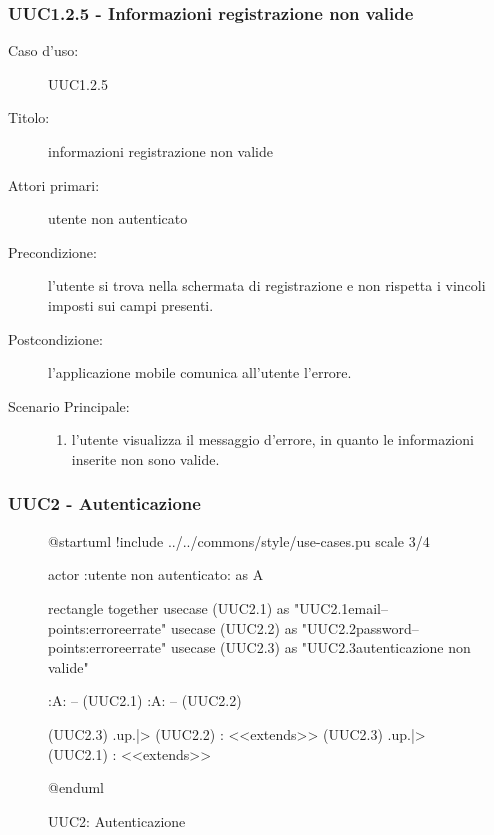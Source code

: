 \documentclass[casi-duso]{subfiles}
\begin{document}
\subsubsection{UUC1.2.5 - Informazioni registrazione non valide}%
\label{subsub:UUC1.2.5utente}
\begin{description}
  \item[Caso d’uso:] UUC1.2.5
  \item[Titolo:] informazioni registrazione non valide
  \item[Attori primari:] utente non autenticato
  \item[Precondizione:] l'utente si trova nella schermata di registrazione e non rispetta i vincoli imposti sui campi presenti.
  \item[Postcondizione:] l'applicazione mobile comunica all'utente l'errore.
  \item[Scenario Principale:]
        \begin{enumerate}
          \item l'utente visualizza il messaggio d'errore, in quanto le informazioni inserite non sono valide.
        \end{enumerate}
\end{description}

\subsubsection{UUC2 - Autenticazione}%
\label{subsub:UUC2utente}

\begin{figure}[h!]
  \centering
  \begin{plantuml}
  @startuml
  !include ../../commons/style/use-cases.pu
  scale 3/4

  actor :utente non autenticato: as A

  rectangle {
    together {
      usecase (UUC2.1) as "UUC2.1\nInserimento email\n--\nExtension points:\nVisualizzazione errore\ncredenziali errate"
      usecase (UUC2.2) as "UUC2.2\nInserimento password\n--\nExtension points:\nVisualizzazione errore\ncredenziali errate"
      usecase (UUC2.3) as "UUC2.3\nInformazioni autenticazione non valide"
    }
  }

  :A: -- (UUC2.1)
  :A: -- (UUC2.2)

  (UUC2.3) .up.|> (UUC2.2) : <<extends>>
  (UUC2.3) .up.|> (UUC2.1) : <<extends>>

  @enduml
  \end{plantuml}
  \caption{UUC2: Autenticazione}
  \label{fig:uuc2}
\end{figure}
\end{document}
